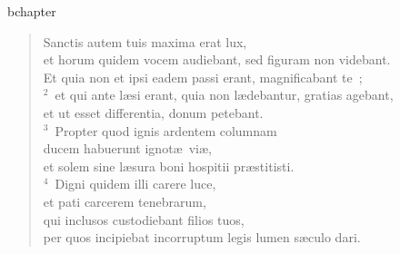 bchapter\begin{flushleft}\begin{verse}\vspace{-19pt}\hspace{6pt}Sanctis autem tuis maxima erat lux,\\\hspace{6pt} et horum quidem vocem audiebant, sed figuram non videbant.\\ Et quia non et ipsi eadem passi erant, magnificabant te~;\\
${}^{2}$~et qui ante l\ae si erant, quia non l\ae debantur, gratias agebant,\\ et ut esset differentia, donum petebant.\\
${}^{3}$~Propter quod ignis ardentem columnam\\ ducem habuerunt ignot\ae\ vi\ae ,\\ et solem sine l\ae sura boni hospitii pr\ae stitisti.\\
${}^{4}$~Digni quidem illi carere luce,\\ et pati carcerem tenebrarum,\\ qui inclusos custodiebant filios tuos,\\ per quos incipiebat incorruptum legis lumen s\ae culo dari.\end{verse}\end{flushleft}


